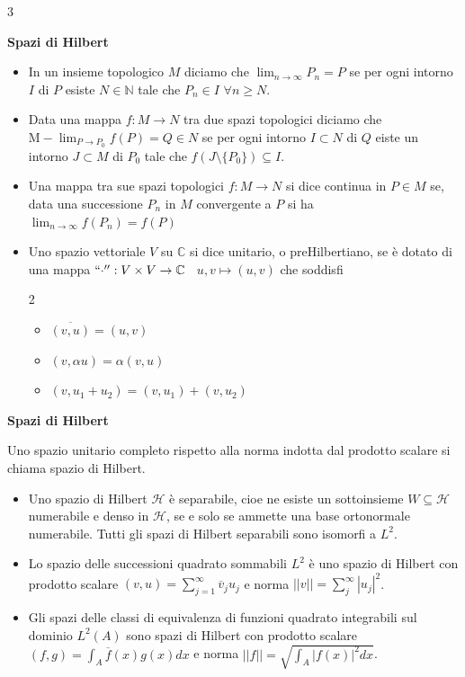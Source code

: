 \documentclass[10pt,a4paper]{report}
\begin{document}
\begin{multicols*}{3}
\begin{center}
\textbf{\large Spazi di Hilbert}\par
	\begin{itemize}[label=$\cdot$]
		\item In un insieme topologico $M$ diciamo che $\lim_{n\rightarrow\infty} P_n=P$ se per ogni intorno $I$ di $P$ esiste $N\in\mathbb{N}$ tale che $P_n\in I$ $\forall n\geq N$.
		\item Data una mappa $f:M\rightarrow N$ tra due spazi topologici diciamo che $\text{M}-\lim_{P\rightarrow P_0} f(P)=Q\in N$ se per ogni intorno $I\subset N$ di $Q$ eiste un intorno $J\subset M$ di $P_0$ tale che $f(J\setminus\{P_0\})\subseteq I$.
		\item Una mappa tra sue spazi topologici $f:M\rightarrow N$ si dice continua in $P\in M$ se, data una successione $P_n$ in $M$ convergente a $P$ si ha $\lim_{n\rightarrow\infty}f(P_n)=f(P)$
		\item Uno spazio vettoriale $V$ su $\mathbb{C}$ si dice unitario, o preHilbertiano, se è dotato di una mappa $``\cdot'':V\times V\rightarrow\mathbb{C}$ ~$u,v\mapsto (u,v)$ che soddisfi 
			\begin{multicols*}{2}
				\begin{itemize}[label=$\cdot$]
					\item $\overline{(v,u)}=(u,v)$
					\item $(v,\alpha u)=\alpha(v,u)$
					\item $(v,u_1+u_2)=(v,u_1)+(v,u_2)$
				\end{itemize}
			\end{multicols*}
	\end{itemize}
\textbf{Spazi di Hilbert} \par
Uno spazio unitario completo rispetto alla norma indotta dal prodotto scalare si chiama spazio di Hilbert.\par
	\begin{itemize}[label=$\cdot$]
		\item Uno spazio di Hilbert $\mathcal{H}$ è separabile, cioe ne esiste un sottoinsieme $W\subseteq\mathcal{H}$ numerabile e denso in $\mathcal{H}$, se e solo se ammette una base ortonormale numerabile. Tutti gli spazi di Hilbert separabili sono isomorfi a $L^2$.
		\item Lo spazio delle successioni quadrato sommabili $L^2$ è uno spazio di Hilbert con prodotto scalare $(v,u)=\sum_{j=1}^\infty \overline{v}_j u_j$ e norma $||v||=\sum_j^\infty |u_j|^2$.
		\item Gli spazi delle classi di equivalenza di funzioni quadrato integrabili sul dominio $L^2(A)$ sono spazi di Hilbert con prodotto scalare $(f,g)=\int_A \overline{f}(x)g(x)dx$ e norma $||f||=\sqrt{\int_A |f(x)|^2 dx}$. 

\end{itemize}
\end{center}
\end{multicols*}
\end{document}
